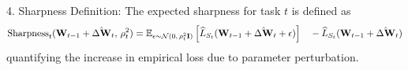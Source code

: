 \documentclass[letterpaper]{article} %
\begin{document}
4. Sharpness Definition: The expected sharpness for task $t$ is defined as
\begin{align}
\mathrm{Sharpness}_t(\mathbf{W}_{t-1} + \hat{\Delta\mathbf{W}}_t,\, \rho_t^2)  = \mathbb{E}_{\epsilon \sim \mathcal{N}(0,\, \rho_t^2 \mathbf{I})}
\left[ \widehat{L}_{S_t}(\mathbf{W}_{t-1} + \hat{\Delta\mathbf{W}}_t + \epsilon) \right] \notag\quad - \widehat{L}_{S_t}(\mathbf{W}_{t-1} + \hat{\Delta\mathbf{W}}_t) \notag
\end{align}
quantifying the increase in empirical loss due to parameter perturbation.
\end{document}
